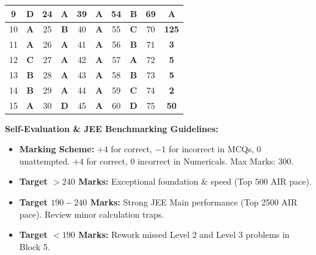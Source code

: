 \documentclass[11pt,a4paper]{article}
\begin{document}
\begin{center}
\begin{tabular}{|c|c||c|c||c|c||c|c||c|c|}
\hline
\rowcolor{white}
9 & \textbf{\textcolor{l1Green}{D}} & 24 & \textbf{\textcolor{l1Green}{A}} & 39 & \textbf{\textcolor{l2Amber}{A}} & 54 & \textbf{\textcolor{l3Crimson}{B}} & 69 & \textbf{\textcolor{l3Crimson}{A}} \\
\hline
\rowcolor{tableStripe}
10 & \textbf{\textcolor{l1Green}{A}} & 25 & \textbf{\textcolor{l1Green}{B}} & 40 & \textbf{\textcolor{l2Amber}{A}} & 55 & \textbf{\textcolor{l3Crimson}{C}} & 70 & \textbf{\textcolor{l3Crimson}{125}} \\
\hline
\rowcolor{white}
11 & \textbf{\textcolor{l1Green}{A}} & 26 & \textbf{\textcolor{l2Amber}{A}} & 41 & \textbf{\textcolor{l2Amber}{A}} & 56 & \textbf{\textcolor{l3Crimson}{B}} & 71 & \textbf{\textcolor{l3Crimson}{3}} \\
\hline
\rowcolor{tableStripe}
12 & \textbf{\textcolor{l1Green}{C}} & 27 & \textbf{\textcolor{l2Amber}{A}} & 42 & \textbf{\textcolor{l2Amber}{A}} & 57 & \textbf{\textcolor{l3Crimson}{A}} & 72 & \textbf{\textcolor{l3Crimson}{5}} \\
\hline
\rowcolor{white}
13 & \textbf{\textcolor{l1Green}{B}} & 28 & \textbf{\textcolor{l2Amber}{A}} & 43 & \textbf{\textcolor{l2Amber}{A}} & 58 & \textbf{\textcolor{l3Crimson}{B}} & 73 & \textbf{\textcolor{l3Crimson}{5}} \\
\hline
\rowcolor{tableStripe}
14 & \textbf{\textcolor{l1Green}{B}} & 29 & \textbf{\textcolor{l2Amber}{A}} & 44 & \textbf{\textcolor{l2Amber}{A}} & 59 & \textbf{\textcolor{l3Crimson}{C}} & 74 & \textbf{\textcolor{l3Crimson}{2}} \\
\hline
\rowcolor{white}
15 & \textbf{\textcolor{l1Green}{A}} & 30 & \textbf{\textcolor{l2Amber}{D}} & 45 & \textbf{\textcolor{l2Amber}{A}} & 60 & \textbf{\textcolor{l3Crimson}{D}} & 75 & \textbf{\textcolor{l3Crimson}{50}} \\
\hline
\end{tabular}
\end{center}

\vspace{10pt}
\begin{tcolorbox}[theorycard]
\footnotesize
\textbf{\textcolor{primaryDark}{Self-Evaluation \& JEE Benchmarking Guidelines:}}
\begin{itemize}[leftmargin=12pt,itemsep=2pt]
  \item \textbf{Marking Scheme:} $+4$ for correct, $-1$ for incorrect in MCQs, $0$ unattempted. $+4$ for correct, $0$ incorrect in Numericals. Max Marks: 300.
  \item \textbf{\textcolor{l1Green}{Target $> 240$ Marks:}} Exceptional foundation \& speed (Top 500 AIR pace).
  \item \textbf{\textcolor{l2Amber}{Target $190 - 240$ Marks:}} Strong JEE Main performance (Top 2500 AIR pace). Review minor calculation traps.
  \item \textbf{\textcolor{l3Crimson}{Target $< 190$ Marks:}} Rework missed Level 2 and Level 3 problems in Block 5.
\end{itemize}
\end{tcolorbox}
\end{document}
